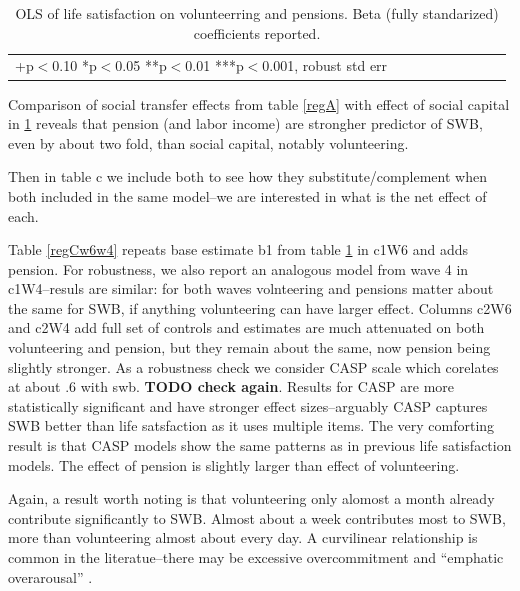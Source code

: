 \documentclass[10pt, letterpaper]{article}
\begin{document}
\begin{spacing}{1.4}
\begin{spacing}{.9}
\begin{table}[H]\centering \caption{OLS of life satisfaction on volunteerring
    and pensions. Beta (fully standarized) coefficients reported. }  \begin{scriptsize} \begin{tabular}{p{1.8in}p{.5in}p{.5in}p{.5in}p{.5in}p{.5in}p{.5in}p{.5in}p{.5in}p{.5in}p{.4in}p{.5in}p{.4in}}\hline 
      \hline\multicolumn{5}{l}{+p$<$0.10 *p$<$0.05 **p$<$0.01 ***p$<$0.001,
        robust std err} \end{tabular}\label{regB} \end{scriptsize}\end{table}
\end{spacing}


Comparison of social transfer effects from table \ref{regA} with effect of 
 social capital in \ref{regB} reveals that pension (and labor income) are
 strongher  predictor of SWB, even by about two fold,  than social capital, notably volunteering.

Then in table c we include both to see how they substitute/complement
when both included in the same model--we are interested in what is the net
effect of each.

Table \ref{regCw6w4} repeats base estimate b1 from table \ref{regB} in c1W6 and
adds pension. For
robustness, we also report an analogous model from wave 4 in c1W4--resuls are
similar: for both waves volnteering and pensions matter about the same for SWB,
if anything volunteering can have larger effect.
% 
Columns c2W6 and c2W4 add full set of controls and estimates are much attenuated
on both volunteering and pension, but they remain about the same, now pension
being slightly stronger.
%
As a robustness check we consider CASP scale which corelates at about .6 with
swb. \textbf{TODO check again}. Results for CASP are more statistically
significant and have stronger effect sizes--arguably CASP captures SWB better
than life satsfaction as it uses multiple items. The very comforting result is
that CASP models show the same patterns as in previous life satisfaction
models. The effect of pension is slightly larger than effect of volunteering.

Again, a result worth noting is that volunteering only alomost a month already
contribute significantly to SWB. Almost about a week contributes most
to SWB, more than volunteering almost about every day. A curvilinear
relationship is common in the literatue--there may be excessive overcommitment
and ``emphatic overarousal''  \citep{wilson12B}.%


\end{spacing}
\end{document}

